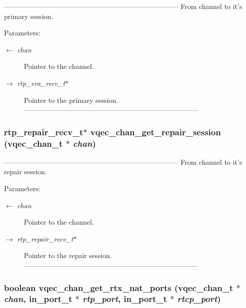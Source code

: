 --------------------------------------------------------------------------- From channel to it's primary session.

\begin{Desc}
\item[Parameters:]
\begin{description}
\item[\mbox{$\leftarrow$} {\em chan}]Pointer to the channel. \item[\mbox{$\rightarrow$} {\em rtp\_\-era\_\-recv\_\-t$\ast$}]Pointer to the primary session. --------------------------------------------------------------------------- \end{description}
\end{Desc}
\subsubsection{\setlength{\rightskip}{0pt plus 5cm}\bf{rtp\_\-repair\_\-recv\_\-t}$\ast$ vqec\_\-chan\_\-get\_\-repair\_\-session (\bf{vqec\_\-chan\_\-t} $\ast$ {\em chan})}\label{vqec__channel__private_8h_78d97640bf3144d8d57576cba2b43a63}


--------------------------------------------------------------------------- From channel to it's repair session.

\begin{Desc}
\item[Parameters:]
\begin{description}
\item[\mbox{$\leftarrow$} {\em chan}]Pointer to the channel. \item[\mbox{$\rightarrow$} {\em rtp\_\-repair\_\-recv\_\-t$\ast$}]Pointer to the repair session. --------------------------------------------------------------------------- \end{description}
\end{Desc}
\subsubsection{\setlength{\rightskip}{0pt plus 5cm}boolean vqec\_\-chan\_\-get\_\-rtx\_\-nat\_\-ports (\bf{vqec\_\-chan\_\-t} $\ast$ {\em chan}, in\_\-port\_\-t $\ast$ {\em rtp\_\-port}, in\_\-port\_\-t $\ast$ {\em rtcp\_\-port})}\label{vqec__channel__private_8h_b6e3acf67687e9d1f20d6b4c1e3242e2}


